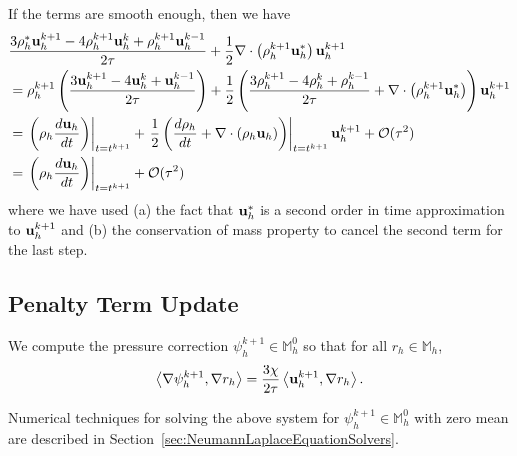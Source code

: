\documentclass[letterpaper]{erdc}
\begin{document}
\begin{remark}
  If the terms are smooth enough, then we have
\begin{align}
  &\frac{3\rho_h^{*}\textbf{u}_h^{k+1}-4\rho_h^{k+1}\textbf{u}_h^{k} +\rho_h^{k+1}\textbf{u}_h^{k-1}}{2\tau} +\frac{1}{2}\nabla\cdot\left(\rho_h^{k+1}\textbf{u}_h^{*}\right)\textbf{u}_h^{k+1}\\
   &= \rho_h^{k+1}\left(\frac{3\textbf{u}_h^{k+1} - 4\textbf{u}_h^{k} + \textbf{u}_h^{k-1}}{2\tau}\right) + \frac{1}{2} \left( \frac{3\rho_h^{k+1} -4\rho_h^{k} + \rho_h^{k-1}}{2\tau} + \nabla\cdot\left(\rho_h^{k+1}\textbf{u}_h^{*}\right)\right)\textbf{u}_h^{k+1}\\
  &= \left.\left(\rho_h\frac{d\textbf{u}_h}{dt} \right)\right|_{t=t^{k+1}} + \left.\frac{1}{2} \left( \frac{d\rho_h}{dt} +\nabla\cdot\left(\rho_h\textbf{u}_h\right)\right)\right|_{t=t^{k+1}}\textbf{u}_h^{k+1} + \mathcal{O}(\tau^2)\\
  &=\left.\left(\rho_h\frac{d\textbf{u}_h}{dt} \right)\right|_{t=t^{k+1}} + \mathcal{O}(\tau^{2})
\end{align}
where we have used (a) the fact that $\textbf{u}_h^{*}$ is a second order in time
approximation to $\textbf{u}_h^{k+1}$ and (b) the conservation of mass property to
cancel the second term for the last step.
\end{remark}




%
%
\subsection{Penalty Term Update}
We compute the pressure correction $\psi_h^{k+1}\in \mathbb{M}_h^0$ so that for all $r_h\in \mathbb{M}_h$,
\begin{equation}
  \left\langle \nabla\psi_h^{k+1}, \nabla r_h \right\rangle = \frac{3\chi}{2\tau}\left\langle \textbf{u}_h^{k+1}, \nabla r_h \right\rangle.
\end{equation}

\begin{remark}
  Numerical techniques for solving the above system for
  $\psi_h^{k+1}\in \mathbb{M}_h^0$ with zero mean are described in
  Section~\ref{sec:NeumannLaplaceEquationSolvers}.
\end{remark}

%
%
\end{document}
